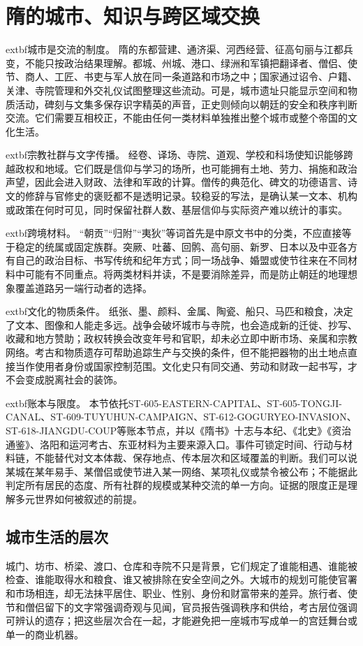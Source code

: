 \section{隋的城市、知识与跨区域交换}
\label{sec:sui-cities-knowledge-exchange}

\noindent	extbf{城市是交流的制度。} 隋的东都营建、通济渠、河西经营、征高句丽与江都兵变，不能只按政治结果理解。都城、州城、港口、绿洲和军镇把翻译者、僧侣、使节、商人、工匠、书吏与军人放在同一条道路和市场之中；国家通过诏令、户籍、关津、寺院管理和外交礼仪试图整理这些流动。可是，城市遗址只能显示空间和物质活动，碑刻与文集多保存识字精英的声音，正史则倾向以朝廷的安全和秩序判断交流。它们需要互相校正，不能由任何一类材料单独推出整个城市或整个帝国的文化生活。

\noindent	extbf{宗教社群与文字传播。} 经卷、译场、寺院、道观、学校和科场使知识能够跨越政权和地域。它们既是信仰与学习的场所，也可能拥有土地、劳力、捐施和政治声望，因此会进入财政、法律和军政的计算。僧传的典范化、碑文的功德语言、诗文的修辞与官修史的褒贬都不是透明记录。较稳妥的写法，是确认某一文本、机构或政策在何时可见，同时保留社群人数、基层信仰与实际资产难以统计的事实。

\noindent	extbf{跨境材料。} “朝贡”“归附”“夷狄”等词首先是中原文书中的分类，不应直接等于稳定的统属或固定族群。突厥、吐蕃、回鹘、高句丽、新罗、日本以及中亚各方有自己的政治目标、书写传统和纪年方式；同一场战争、婚盟或使节往来在不同材料中可能有不同重点。将两类材料并读，不是要消除差异，而是防止朝廷的地理想象覆盖道路另一端行动者的选择。

\noindent	extbf{文化的物质条件。} 纸张、墨、颜料、金属、陶瓷、船只、马匹和粮食，决定了文本、图像和人能走多远。战争会破坏城市与寺院，也会造成新的迁徙、抄写、收藏和地方赞助；政权转换会改变年号和官职，却未必立即中断市场、亲属和宗教网络。考古和物质遗存可帮助追踪生产与交换的条件，但不能把器物的出土地点直接当作使用者身份或国家控制范围。文化史只有同交通、劳动和财政一起书写，才不会变成脱离社会的装饰。

\noindent	extbf{账本与限度。} 本节依托ST-605-EASTERN-CAPITAL、ST-605-TONGJI-CANAL、ST-609-TUYUHUN-CAMPAIGN、ST-612-GOGURYEO-INVASION、ST-618-JIANGDU-COUP等账本节点，并以《隋书》十志与本纪、《北史》《资治通鉴》、洛阳和运河考古、东亚材料为主要来源入口。事件可锁定时间、行动与材料链，不能替代对文本体裁、保存地点、传本层次和区域覆盖的判断。我们可以说某城在某年易手、某僧侣或使节进入某一网络、某项礼仪或禁令被公布；不能据此判定所有居民的态度、所有社群的规模或某种交流的单一方向。证据的限度正是理解多元世界如何被叙述的前提。

\subsection{城市生活的层次}
城门、坊市、桥梁、渡口、仓库和寺院不只是背景，它们规定了谁能相遇、谁能被检查、谁能取得水和粮食、谁又被排除在安全空间之外。大城市的规划可能使官署和市场相连，却无法抹平居住、职业、性别、身份和财富带来的差异。旅行者、使节和僧侣留下的文字常强调奇观与见闻，官员报告强调秩序和供给，考古层位强调可辨认的遗存；把这些层次合在一起，才能避免把一座城市写成单一的宫廷舞台或单一的商业机器。

